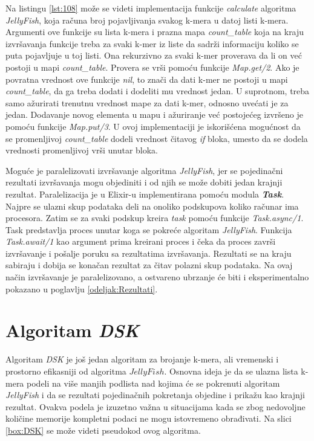 \documentclass[12pt,oneside]{memoir}
\begin{document}
Na listingu \ref{lst:108} može se videti implementacija funkcije \textit{calculate} algoritma \textit{JellyFish}, koja računa broj pojavljivanja svakog k-mera u datoj listi k-mera. Argumenti ove funkcije su lista k-mera i prazna mapa \textit{count\_table} koja na kraju izvršavanja funkcije treba za svaki k-mer iz liste da sadrži informaciju koliko se puta pojavljuje u toj listi. Ona rekurzivno za svaki k-mer proverava da li on već postoji u mapi \textit{count\_table}. Provera se vrši pomoću funkcije \textit{Map.get/2}. Ako je povratna vrednost ove funkcije \textit{nil}, to znači da dati k-mer ne postoji u mapi \textit{count\_table}, da ga treba dodati i dodeliti mu vrednost jedan. U suprotnom, treba samo ažurirati trenutnu vrednost mape za dati k-mer, odnosno uvećati je za jedan. Dodavanje novog elementa u mapu i ažuriranje već postojećeg izvršeno je pomoću funkcije \textit{Map.put/3}. U ovoj implementaciji je iskorišćena mogućnost da se promenljivoj \textit{count\_table} dodeli vrednost čitavog \textit{if} bloka, umesto da se dodela vrednosti promenljivoj vrši unutar bloka.



Moguće je paralelizovati izvršavanje algoritma \textit{JellyFish}, jer se pojedinačni rezultati izvršavanja mogu objediniti i od njih se može dobiti jedan krajnji rezultat. Paralelizacija je u Elixir-u implementirana pomoću modula \textit{\textbf{Task}}. Najpre se ulazni skup podataka deli na onoliko podskupova koliko računar ima procesora. Zatim se za svaki podskup kreira \textit{task} pomoću funkcije \textit{Task.async/1}. Task predstavlja proces unutar koga se pokreće algoritam \textit{JellyFish}. Funkcija \textit{Task.await/1} kao argument prima kreirani proces i čeka da proces završi izvršavanje i pošalje poruku sa rezultatima izvršavanja. Rezultati se na kraju sabiraju i dobija se konačan rezultat za čitav polazni skup podataka. Na ovaj način izvršavanje je paralelizovano, a ostvareno ubrzanje će biti i eksperimentalno pokazano u poglavlju \ref{odeljak:Rezultati}.

\section{Algoritam \textit{DSK}}
\label{odeljak:DSK}

Algoritam \textit{DSK} je još jedan algoritam za brojanje k-mera, ali vremenski i prostorno efikasniji od algoritma $JellyFish$. Osnovna ideja je da se ulazna lista k-mera podeli na više manjih podlista nad kojima će se pokrenuti algoritam \textit{JellyFish} i da se rezultati pojedinačnih pokretanja objedine i prikažu kao krajnji rezultat. Ovakva podela je izuzetno važna u situacijama kada se zbog nedovoljne količine memorije kompletni podaci ne mogu istovremeno obrađivati. Na slici \ref{box:DSK} se može videti pseudokod ovog algoritma.
\end{document}
